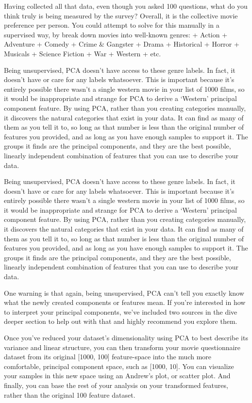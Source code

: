 \documentclass[11pt]{article}
\begin{document}
Having collected all that data, even though you asked 100 questions,
what do you think truly is being measured by the survey? Overall, it is
the collective movie preference per person. You could attempt to solve
for this manually in a supervised way, by break down movies into
well-known genres: + Action + Adventure + Comedy + Crime \& Gangster +
Drama + Historical + Horror + Musicals + Science Fiction + War + Western
+ etc.

Being unsupervised, PCA doesn't have access to these genre labels. In
fact, it doesn't have or care for any labels whatsoever. This is
important because it's entirely possible there wasn't a single western
movie in your list of 1000 films, so it would be inappropriate and
strange for PCA to derive a `Western' principal component feature. By
using PCA, rather than you creating categories manually, it discovers
the natural categories that exist in your data. It can find as many of
them as you tell it to, so long as that number is less than the original
number of features you provided, and as long as you have enough samples
to support it. The groups it finds are the principal components, and
they are the best possible, linearly independent combination of features
that you can use to describe your data.

Being unsupervised, PCA doesn't have access to these genre labels. In
fact, it doesn't have or care for any labels whatsoever. This is
important because it's entirely possible there wasn't a single western
movie in your list of 1000 films, so it would be inappropriate and
strange for PCA to derive a `Western' principal component feature. By
using PCA, rather than you creating categories manually, it discovers
the natural categories that exist in your data. It can find as many of
them as you tell it to, so long as that number is less than the original
number of features you provided, and as long as you have enough samples
to support it. The groups it finds are the principal components, and
they are the best possible, linearly independent combination of features
that you can use to describe your data.

One warning is that again, being unsupervised, PCA can't tell you
exactly know what the newly created components or features mean. If
you're interested in how to interpret your principal components, we've
included two sources in the dive deeper section to help out with that
and highly recommend you explore them.

Once you've reduced your dataset's dimensionality using PCA to best
describe its variance and linear structure, you can then transform your
movie questionnaire dataset from its original {[}1000, 100{]}
feature-space into the much more comfortable, principal component space,
such as {[}1000, 10{]}. You can visualize your samples in this new space
using an Andrew's plot, or scatter plot. And finally, you can base the
rest of your analysis on your transformed features, rather than the
original 100 feature dataset.
\end{document}

